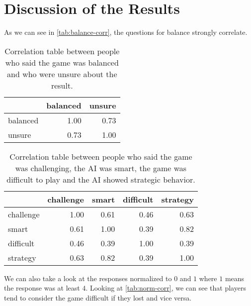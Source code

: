 \section{Discussion of the Results}

As we can see in \autoref{tab:balance-corr}, the questions for balance strongly correlate.

\begin{table}[h]
	\centering
	\begin{tabular}{lrr}
		\toprule
		{} &  balanced &  unsure \\
		\midrule
		balanced &      1.00 &    0.73 \\
		unsure   &      0.73 &    1.00 \\
		\bottomrule
	\end{tabular}
	\caption{Correlation table between people who said the game was balanced and who were unsure about the result.}	
	\label{tab:balance-corr}
\end{table}

\begin{table}[h]
	\centering
	\begin{tabular}{lrrrr}
		\toprule
		{} &  challenge &  smart &  difficult &  strategy \\
		\midrule
		challenge &       1.00 &   0.61 &       0.46 &      0.63 \\
		smart     &       0.61 &   1.00 &       0.39 &      0.82 \\
		difficult &       0.46 &   0.39 &       1.00 &      0.39 \\
		strategy  &       0.63 &   0.82 &       0.39 &      1.00 \\
		\bottomrule
	\end{tabular}
	\caption{Correlation table between people who said the game was challenging, the AI was smart, the game was difficult to play and the AI showed strategic behavior.}
	\label{tab:difficulty-corr}
\end{table}


We can also take a look at the responses normalized to $0$ and $1$ where $1$ means
the response was at least $4$. Looking at \autoref{tab:norm-corr}, we can see that players
tend to consider the game difficult if they lost and vice versa.

